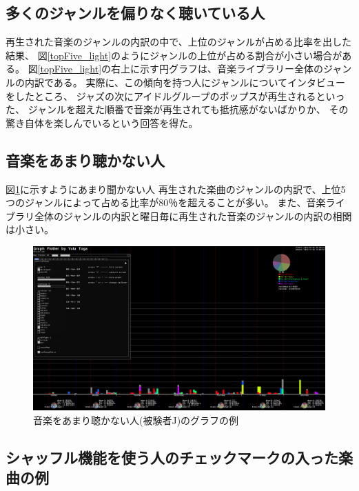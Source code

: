 \documentclass[11pt, onecolumn]{jsarticle}
\begin{document}
\clearpage

\subsection{多くのジャンルを偏りなく聴いている人}
再生された音楽のジャンルの内訳の中で、上位のジャンルが占める比率を出した結果、
図\ref{topFive_light}のようにジャンルの上位が占める割合が小さい場合がある。
図\ref{topFive_light}の右上に示す円グラフは、音楽ライブラリー全体のジャンルの内訳である。
実際に、この傾向を持つ人にジャンルについてインタビューをしたところ、
ジャズの次にアイドルグループのポップスが再生されるといった、
ジャンルを超えた順番で音楽が再生されても抵抗感がないばかりか、
その驚き自体を楽しんでいるという回答を得た。




\subsection{音楽をあまり聴かない人}
図\ref{lightListner}に示すようにあまり聞かない人
再生された楽曲のジャンルの内訳で、上位5つのジャンルによって占める比率が80％を超えることが多い。
また、音楽ライブラリ全体のジャンルの内訳と曜日毎に再生された音楽のジャンルの内訳の相関は小さい。

\begin{figure}[h]
\begin{center}
\includegraphics[width=14cm]{takino.png}
\caption{音楽をあまり聴かない人(被験者J)のグラフの例}
\label{lightListner}
\end{center}
\end{figure}

\clearpage

\subsection{シャッフル機能を使う人のチェックマークの入った楽曲の例}
\end{document}
